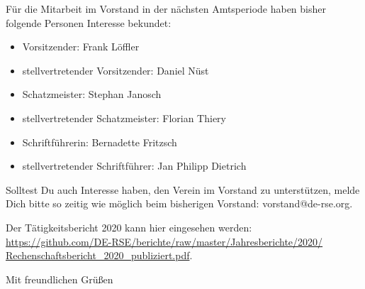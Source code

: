 \documentclass[../Vorlagen/de-RSE_Brief,a4paper]{scrlttr2}
\begin{document}
\begin{letter}{\mbox{}
}
\clearpage
Für die Mitarbeit im Vorstand in der nächsten Amtsperiode haben bisher folgende Personen Interesse bekundet:
\begin{itemize}
 \item Vorsitzender: Frank Löffler
 \item stellvertretender Vorsitzender: Daniel Nüst
 \item Schatzmeister: Stephan Janosch
 \item stellvertretender Schatzmeister: Florian Thiery
 \item Schriftführerin: Bernadette Fritzsch
 \item stellvertretender Schriftführer: Jan Philipp Dietrich
\end{itemize}
Solltest Du auch Interesse haben, den Verein im Vorstand zu unterstützen, melde Dich bitte so zeitig wie möglich beim bisherigen Vorstand: vorstand@de-rse.org.

Der Tätigkeitsbericht 2020 kann hier eingesehen werden:\\
\href{https://github.com/DE-RSE/berichte/raw/master/Jahresberichte/2020/Rechenschaftsbericht_2020_publiziert.pdf}{https://github.com/DE-RSE/berichte/raw/master/Jahresberichte/2020/\\Rechenschaftsbericht\_2020\_publiziert.pdf}.

\closing{Mit freundlichen Grüßen}
\end{letter}
\end{document}
